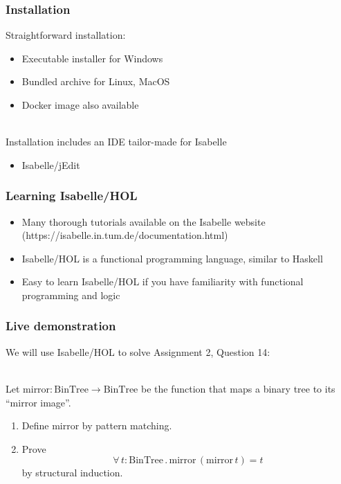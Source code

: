 \documentclass{beamer}
\begin{document}
  \begin{frame}
    \frametitle{Installation}
    Straightforward installation:
    \begin{itemize}
      \item Executable installer for Windows
      \item Bundled archive for Linux, MacOS
      \item Docker image also available\\~\

    \end{itemize}

    Installation includes an IDE tailor-made for Isabelle
    \begin{itemize}
      \item Isabelle/jEdit
    \end{itemize}
  \end{frame}

  \begin{frame}
    \frametitle{Learning Isabelle/HOL}
    \begin{itemize}
      \item Many thorough tutorials available on the Isabelle website
      (https://isabelle.in.tum.de/documentation.html)
      \item Isabelle/HOL is a functional programming language, similar to Haskell
      \item Easy to learn Isabelle/HOL if you have familiarity with functional
      programming and logic
    \end{itemize}
  \end{frame}

  \begin{frame}
    \frametitle{Live demonstration}
    We will use Isabelle/HOL to solve Assignment 2, Question 14:\\~\

    Let $\textrm{mirror} : \textrm{BinTree} \rightarrow
    \textrm{BinTree}$
    be the function that maps a binary tree to its ``mirror image''.

    \begin{enumerate}
      \item Define $\textrm{mirror}$ by pattern matching.

      \item Prove \[\forall\, t : \textrm{BinTree} \mathrel.
      \textrm{mirror}\,(\textrm{mirror}\,t) = t\] by structural
      induction.\\~\

    \end{enumerate}
  \end{frame}
\end{document}
